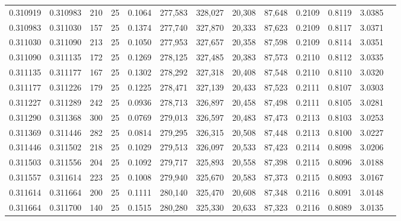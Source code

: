 \begin{tabular}{rrrrrrrrrrrrr}
0.310919 & 0.310983 &   210 &  25 &                                     0.1064 & 277,583 & 328,027 &  20,308 &  87,648 & 0.2109 & 0.8119 & 3.0385 \\
0.310983 & 0.311030 &   157 &  25 &                                     0.1374 & 277,740 & 327,870 &  20,333 &  87,623 & 0.2109 & 0.8117 & 3.0371 \\
0.311030 & 0.311090 &   213 &  25 &                                     0.1050 & 277,953 & 327,657 &  20,358 &  87,598 & 0.2109 & 0.8114 & 3.0351 \\
0.311090 & 0.311135 &   172 &  25 &                                     0.1269 & 278,125 & 327,485 &  20,383 &  87,573 & 0.2110 & 0.8112 & 3.0335 \\
0.311135 & 0.311177 &   167 &  25 &                                     0.1302 & 278,292 & 327,318 &  20,408 &  87,548 & 0.2110 & 0.8110 & 3.0320 \\
0.311177 & 0.311226 &   179 &  25 &                                     0.1225 & 278,471 & 327,139 &  20,433 &  87,523 & 0.2111 & 0.8107 & 3.0303 \\
0.311227 & 0.311289 &   242 &  25 &                                     0.0936 & 278,713 & 326,897 &  20,458 &  87,498 & 0.2111 & 0.8105 & 3.0281 \\
0.311290 & 0.311368 &   300 &  25 &                                     0.0769 & 279,013 & 326,597 &  20,483 &  87,473 & 0.2113 & 0.8103 & 3.0253 \\
0.311369 & 0.311446 &   282 &  25 &                                     0.0814 & 279,295 & 326,315 &  20,508 &  87,448 & 0.2113 & 0.8100 & 3.0227 \\
0.311446 & 0.311502 &   218 &  25 &                                     0.1029 & 279,513 & 326,097 &  20,533 &  87,423 & 0.2114 & 0.8098 & 3.0206 \\
0.311503 & 0.311556 &   204 &  25 &                                     0.1092 & 279,717 & 325,893 &  20,558 &  87,398 & 0.2115 & 0.8096 & 3.0188 \\
0.311557 & 0.311614 &   223 &  25 &                                     0.1008 & 279,940 & 325,670 &  20,583 &  87,373 & 0.2115 & 0.8093 & 3.0167 \\
0.311614 & 0.311664 &   200 &  25 &                                     0.1111 & 280,140 & 325,470 &  20,608 &  87,348 & 0.2116 & 0.8091 & 3.0148 \\
0.311664 & 0.311700 &   140 &  25 &                                     0.1515 & 280,280 & 325,330 &  20,633 &  87,323 & 0.2116 & 0.8089 & 3.0135 \\

\end{tabular}
